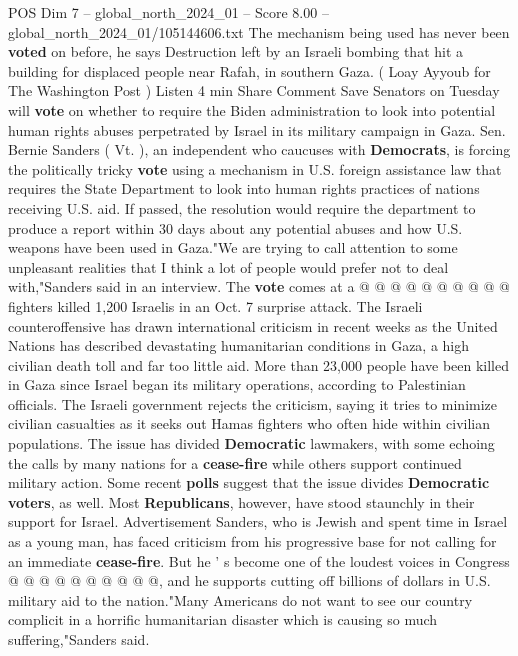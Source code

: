 \begin{textsample}{POS Dim 7 – global\_north\_2024\_01 – Score 8.00 – global\_north\_2024\_01/105144606.txt}  \label{ex:f7_pos_191}
The mechanism being used has never been \textbf{voted} on before, he says Destruction left by an Israeli bombing that hit a building for displaced people near Rafah, in southern Gaza. ( Loay Ayyoub for The Washington Post ) Listen 4 min Share Comment Save Senators on Tuesday will \textbf{vote} on whether to require the Biden administration to look into potential human rights abuses perpetrated by Israel in its military campaign in Gaza.
Sen.
Bernie Sanders ( Vt. ), an independent who caucuses with \textbf{Democrats}, is forcing the politically tricky \textbf{vote} using a mechanism in U.S. foreign assistance law that requires the State Department to look into human rights practices of nations receiving U.S. aid.
If passed, the resolution would require the department to produce a report within 30 days about any potential abuses and how U.S. weapons have been used in Gaza."We are trying to call attention to some unpleasant realities that I think a lot of people would prefer not to deal with,"Sanders said in an interview.
The \textbf{vote} comes at a @ @ @ @ @ @ @ @ @ @ fighters killed 1,200 Israelis in an Oct. 7 surprise attack.
The Israeli counteroffensive has drawn international criticism in recent weeks as the United Nations has described devastating humanitarian conditions in Gaza, a high civilian death toll and far too little aid.
More than 23,000 people have been killed in Gaza since Israel began its military operations, according to Palestinian officials.
The Israeli government rejects the criticism, saying it tries to minimize civilian casualties as it seeks out Hamas fighters who often hide within civilian populations.
The issue has divided \textbf{Democratic} lawmakers, with some echoing the calls by many nations for a \textbf{cease-fire} while others support continued military action.
Some recent \textbf{polls} suggest that the issue divides \textbf{Democratic} \textbf{voters}, as well.
Most \textbf{Republicans}, however, have stood staunchly in their support for Israel.
Advertisement Sanders, who is Jewish and spent time in Israel as a young man, has faced criticism from his progressive base for not calling for an immediate \textbf{cease-fire}.
But he ' s become one of the loudest voices in Congress @ @ @ @ @ @ @ @ @ @, and he supports cutting off billions of dollars in U.S. military aid to the nation."Many Americans do not want to see our country complicit in a horrific humanitarian disaster which is causing so much suffering,"Sanders said.

\end{textsample}
